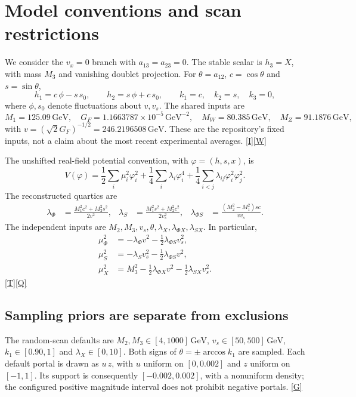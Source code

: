 \documentclass[11pt,a4paper]{article}
\newcommand{\src}[1]{\hyperlink{src:#1}{\textsf{[#1]}}}
\newcommand{\GeV}{\,\mathrm{GeV}}
\begin{document}
\section{Model conventions and scan restrictions}
\label{sec:model}
We consider the $v_x=0$ branch with $a_{13}=a_{23}=0$.
The stable scalar is $h_3=X$, with mass $M_3$ and vanishing doublet projection.
For $\theta=a_{12}$, $c=\cos\theta$ and $s=\sin\theta$,
\begin{equation}
 h_1=c\,\phi-s\,s_0,\qquad h_2=s\,\phi+c\,s_0,
 \qquad k_1=c,\quad k_2=s,\quad k_3=0,
\end{equation}
where $\phi,s_0$ denote fluctuations about $v,v_s$.
The shared inputs are
\begin{equation}
 M_1=125.09\GeV,\quad
 G_F=1.1663787\times10^{-5}\GeV^{-2},\quad
 M_W=80.385\GeV,\quad M_Z=91.1876\GeV,
\end{equation}
with $v=(\sqrt{2}G_F)^{-1/2}=246.2196508\GeV$.
These are the repository's fixed inputs, not a claim about the most recent
experimental averages. \src{I}\src{W}

The unshifted real-field potential convention, with $\varphi=(h,s,x)$, is
\begin{equation}
 V(\varphi)=\frac12\sum_i\mu_i^2\varphi_i^2
 +\frac14\sum_i\lambda_i\varphi_i^4
 +\frac14\sum_{i<j}\lambda_{ij}\varphi_i^2\varphi_j^2.
 \label{eq:potential}
\end{equation}
The reconstructed quartics are
\begin{align}
 \lambda_\Phi&=\frac{M_1^2c^2+M_2^2s^2}{2v^2},&
 \lambda_S&=\frac{M_1^2s^2+M_2^2c^2}{2v_s^2},&
 \lambda_{\Phi S}&=\frac{(M_2^2-M_1^2)sc}{vv_s}.
\end{align}
The independent inputs are $M_2,M_3,v_s,\theta,\lambda_X,
\lambda_{\Phi X},\lambda_{SX}$. In particular,
\begin{align}
 \mu_\Phi^2&=-\lambda_\Phi v^2-\tfrac12\lambda_{\Phi S}v_s^2,\nonumber\\
 \mu_S^2&=-\lambda_S v_s^2-\tfrac12\lambda_{\Phi S}v^2,\nonumber\\
 \mu_X^2&=M_3^2-\tfrac12\lambda_{\Phi X}v^2-\tfrac12\lambda_{SX}v_s^2.
\end{align}
\src{T}\src{Q}

\subsection{Sampling priors are separate from exclusions}
The random-scan defaults are $M_2,M_3\in[4,1000]\GeV$,
$v_s\in[50,500]\GeV$, $k_1\in[0.90,1]$ and
$\lambda_X\in[0,10]$. Both signs of
$\theta=\pm\arccos k_1$ are sampled. Each default portal is drawn as
$u\,z$, with $u$ uniform on $[0,0.002]$ and $z$ uniform on $[-1,1]$.
Its support is consequently $[-0.002,0.002]$, with a nonuniform density;
the configured positive magnitude interval does not prohibit negative portals.
\src{G}
\end{document}
